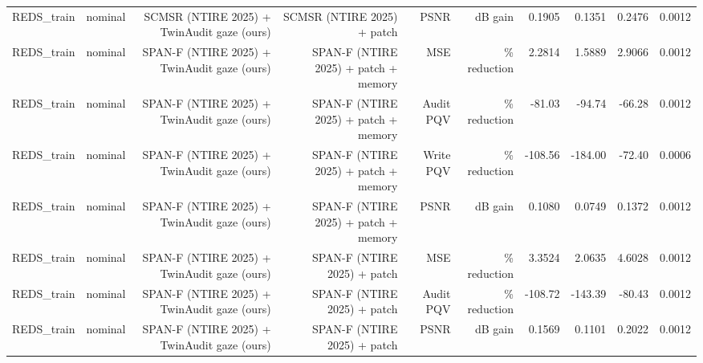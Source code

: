 \begin{table}[t]
\begin{tabular}{llrrrrrrrr}
REDS\_train & nominal & SCMSR (NTIRE 2025) + TwinAudit gaze (ours) & SCMSR (NTIRE 2025) + patch & PSNR & dB gain & 0.1905 & 0.1351 & 0.2476 & 0.0012 \\
REDS\_train & nominal & SPAN-F (NTIRE 2025) + TwinAudit gaze (ours) & SPAN-F (NTIRE 2025) + patch + memory & MSE & \% reduction & 2.2814 & 1.5889 & 2.9066 & 0.0012 \\
REDS\_train & nominal & SPAN-F (NTIRE 2025) + TwinAudit gaze (ours) & SPAN-F (NTIRE 2025) + patch + memory & Audit PQV & \% reduction & -81.03 & -94.74 & -66.28 & 0.0012 \\
REDS\_train & nominal & SPAN-F (NTIRE 2025) + TwinAudit gaze (ours) & SPAN-F (NTIRE 2025) + patch + memory & Write PQV & \% reduction & -108.56 & -184.00 & -72.40 & 0.0006 \\
REDS\_train & nominal & SPAN-F (NTIRE 2025) + TwinAudit gaze (ours) & SPAN-F (NTIRE 2025) + patch + memory & PSNR & dB gain & 0.1080 & 0.0749 & 0.1372 & 0.0012 \\
REDS\_train & nominal & SPAN-F (NTIRE 2025) + TwinAudit gaze (ours) & SPAN-F (NTIRE 2025) + patch & MSE & \% reduction & 3.3524 & 2.0635 & 4.6028 & 0.0012 \\
REDS\_train & nominal & SPAN-F (NTIRE 2025) + TwinAudit gaze (ours) & SPAN-F (NTIRE 2025) + patch & Audit PQV & \% reduction & -108.72 & -143.39 & -80.43 & 0.0012 \\
REDS\_train & nominal & SPAN-F (NTIRE 2025) + TwinAudit gaze (ours) & SPAN-F (NTIRE 2025) + patch & PSNR & dB gain & 0.1569 & 0.1101 & 0.2022 & 0.0012 \\
\bottomrule
\end{tabular}
\end{table}
